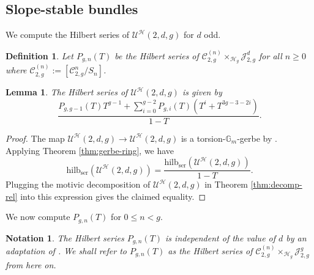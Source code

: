 \documentclass[11pt]{amsart}
\newtheorem{definition}{Definition}[subsection]
\newtheorem{notation}{Notation}
\newtheorem{lemma}[theorem]{Lemma}
\theoremstyle{definition}
\newcommand{\hilb}{\mathrm{hilb}_{\mathrm{ser}}}
\newcommand{\ri}{\rightarrow}
\newcommand{\jac}{\mathcal{J}}
\newcommand{\h}{\mathcal{H}}
\newcommand{\U}{\mathscr{U}}
\newcommand{\mcalu}{\mathcal{U}}
\newcommand{\mC}{\mathcal{C}}
\newcommand{\gm}{\mathbb{G}_m}
\begin{document}
\subsection{Slope-stable bundles}
We compute the Hilbert series of $\U^\h(2,d,g)$ for $d$ odd. 
\begin{definition}
    Let $P_{g,n}(T)$ be the Hilbert series of $\mC_{2,g}^{(n)}\times_{\h_g}\jac^d_{2,g}$ for all $n\geq 0$ where $\mC_{2,g}^{(n)}:= [\mC_{2,g}^n/S_n]$.
\end{definition}
\begin{lemma}\label{lem:stable-hilb}
    The Hilbert series of $\U^\h(2,d,g)$ is given by
    $$\dfrac{P_{g,g-1}(T)T^{g-1}+\sum_{i=0}^{g-2}P_{g,i}(T)(T^i+T^{3g-3-2i})}{1-T}.$$
\end{lemma}
\begin{proof}
The map $\U^\h(2,d,g)\ri \mcalu^\h(2,d,g)$ is a torsion-$\gm$-gerbe by \cite[Theorem B]{brauer}.
Applying Theorem \ref{thm:gerbe-ring}, we have $$\hilb(\U^\h(2,d,g)) =\dfrac{\hilb(\mcalu^\h(2,d,g))}{1-T}.$$
Plugging the motivic decomposition of $\mcalu^\h(2,d,g)$ in Theorem \ref{thm:decomp-rel}  into this expression gives the claimed equality.
\end{proof}
We now compute $P_{g,n}(T)$ for $0\leq n< g$.
\begin{notation}
The Hilbert series $P_{g,n}(T)$ is independent of the value of $d$ by an adaptation of \cite[Proposition 0.1]{bae-maulik}.
We shall refer to $P_{g,n}(T)$ as the Hilbert series of $\mC_{2,g}^{(n)}\times_{\h_g}\jac^g_{2,g}$ from here on.
\end{notation}
\end{document}
